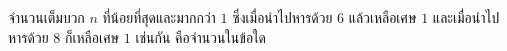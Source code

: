 ﻿%
\question จำนวนเต็มบวก $n$ ที่น้อยที่สุดและมากกว่า $1$ ซึ่งเมื่อนำไปหารด้วย $6$ แล้วเหลือเศษ $1$ และเมื่อนำไปหารด้วย $8$ ก็เหลือเศษ $1$ เช่นกัน คือจำนวนในข้อใด
\newline 
{}
